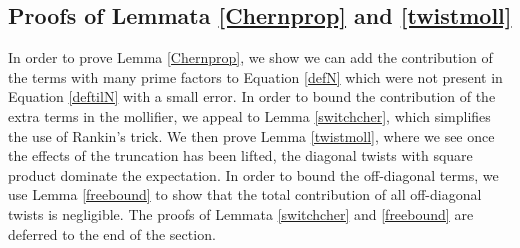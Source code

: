 \documentclass[12pt]{amsart}
\numberwithin{equation}{section}
\numberwithin{thm}{section}
\newcommand{\1}{\mathbf 1}
\begin{document}
\subsection{Proofs of Lemmata \ref{Chernprop} and \ref{twistmoll}} In order to prove Lemma \ref{Chernprop}, we show we can add the contribution of the terms with many prime factors to Equation \eqref{defN} which were not present in Equation \eqref{deftilN} with a small error. In order to bound the contribution of the extra terms in the mollifier, we appeal to Lemma \ref{switchcher}, which simplifies the use of Rankin's trick. We then prove Lemma \ref{twistmoll}, where we see once the effects of the truncation has been lifted, the diagonal twists with square product dominate the expectation. In order to bound the off-diagonal terms, we use Lemma \ref{freebound} to show that the total contribution of all off-diagonal twists is negligible. The proofs of Lemmata \ref{switchcher} and \ref{freebound} are deferred to the end of the section.
\end{document}
